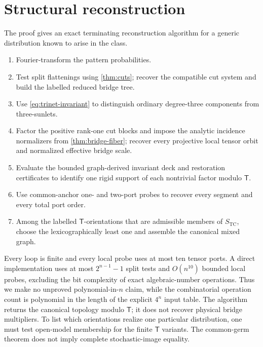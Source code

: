 \documentclass[11pt]{article}
\theoremstyle{remark}
\newcommand{\TCs}{S_{\mathrm{TC}}}
\newcommand{\Tmove}{\mathsf T}
\begin{document}
\section{Structural reconstruction}\label{sec:reconstruction}

The proof gives an exact terminating reconstruction algorithm for a generic
distribution known to arise in the class.

\begin{enumerate}[label=\textbf{R\arabic*.}]
\item Fourier-transform the pattern probabilities.
\item Test split flattenings using \cref{thm:cuts}; recover the compatible cut
      system and build the labelled reduced bridge tree.
\item Use \eqref{eq:trinet-invariant} to distinguish ordinary degree-three components from
      three-sunlets.
\item Factor the positive rank-one cut blocks and impose the analytic
      incidence normalizers from \cref{thm:bridge-fiber}; recover every
      projective local tensor orbit and normalized effective bridge scale.
\item Evaluate the bounded graph-derived invariant deck and restoration
      certificates to identify one rigid support of each nontrivial factor
      modulo $\Tmove$.
\item Use common-anchor one- and two-port probes to recover every segment and
      every total port order.
\item Among the labelled $\Tmove$-orientations that are admissible members of
      $\TCs$, choose the lexicographically least one and assemble the canonical
      mixed graph.
\end{enumerate}

Every loop is finite and every local probe uses at most ten tensor ports.  A
direct implementation uses at most $2^{n-1}-1$ split tests and
$O(n^{10})$ bounded local probes, excluding the bit complexity of exact
algebraic-number operations.  Thus we make no unproved polynomial-in-$n$
claim, while the combinatorial operation count is polynomial in the length of
the explicit $4^n$ input table.  The algorithm returns the canonical topology modulo
$\Tmove$; it does not recover physical bridge multipliers.  To list which
orientations realize one particular distribution, one must test open-model
membership for the finite $\Tmove$ variants.  The common-germ theorem does
not imply complete stochastic-image equality.
\end{document}
